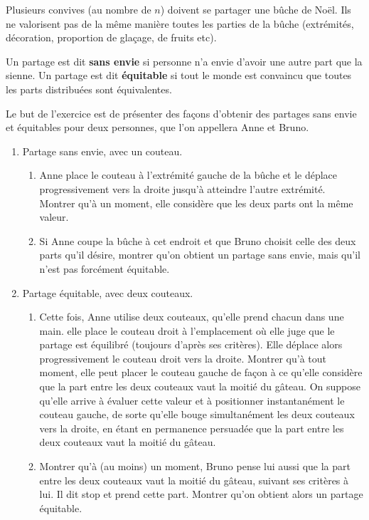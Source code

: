 \begin{exo}
Plusieurs convives (au nombre de $n$) doivent se partager une bûche de Noël. Ils ne valorisent pas de la même manière toutes les parties de la bûche (extrémités, décoration, proportion de glaçage, de fruits etc). 

Un partage est dit \textbf{sans envie} si personne n'a envie d'avoir une autre part que la sienne. Un partage est dit \textbf{équitable} si tout le monde est convaincu que toutes les parts distribuées sont équivalentes.

Le but de l'exercice est de présenter des façons d'obtenir des partages sans envie et équitables pour deux personnes, que l'on appellera Anne et Bruno.


\begin{enumerate}
\item Partage sans envie, avec un couteau.
\begin{enumerate}
\item  Anne place le couteau à l'extrémité gauche de la bûche et le déplace progressivement vers la droite jusqu'à atteindre l'autre extrémité. Montrer qu'à un moment, elle considère que les deux parts ont la même valeur.
\item Si Anne coupe la bûche à cet endroit et que  Bruno choisit celle des deux parts qu'il désire, montrer qu'on obtient un partage sans envie, mais qu'il n'est pas forcément équitable.
\end{enumerate}
\item Partage équitable, avec deux couteaux.
\begin{enumerate}
\item Cette fois, Anne utilise deux couteaux, qu'elle prend chacun dans une main. elle place le couteau droit à l'emplacement où elle juge que le partage est équilibré (toujours d'après ses critères). Elle déplace alors progressivement le couteau droit vers la droite. Montrer qu'à tout moment, elle peut placer le couteau gauche de façon à ce qu'elle considère que la part entre les deux couteaux vaut la moitié du gâteau. On suppose qu'elle arrive à évaluer cette valeur et à positionner instantanément le couteau gauche, de sorte qu'elle bouge simultanément les deux couteaux vers la droite, en étant en permanence persuadée que la part entre les deux couteaux vaut la moitié du gâteau.
\item Montrer qu'à (au moins) un moment, Bruno pense lui aussi que la part entre les deux couteaux vaut la moitié du gâteau, suivant ses critères à lui. Il dit \og stop\fg{} et prend cette part. Montrer qu'on obtient alors un partage équitable.

\end{enumerate}
\end{enumerate}
\end{exo}
